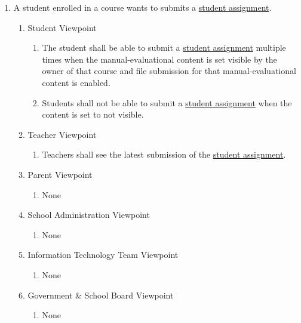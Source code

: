 \documentclass[]{article}
\begin{document}
\begin{enumerate}[{BE}1.]
	\item A student enrolled in a course wants to submits a \underline{student assignment}.
	\begin{enumerate}[{VP2}.1]
		\item Student Viewpoint
			\begin{enumerate}
				\item The student shall be able to submit a \underline{student assignment}
multiple times when the manual-evaluational content is set visible by the
owner of that course and file submission for that manual-evaluational content is
enabled.
\item Students shall not be able to submit a \underline{student assignment} when 
the content is set to not visible.
			\end{enumerate}
		\item Teacher Viewpoint
			\begin{enumerate}
				\item Teachers shall see the latest submission of the \underline{student 
assignment}.
			\end{enumerate}
		\item Parent Viewpoint
			\begin{enumerate}
				\item None
			\end{enumerate}
		\item School Administration Viewpoint
			\begin{enumerate}
				\item None
			\end{enumerate}
		\item Information Technology Team Viewpoint
			\begin{enumerate}
				\item None
			\end{enumerate}
		\item Government \& School Board Viewpoint
			\begin{enumerate}
				\item None
			\end{enumerate}
	\end{enumerate}


\end{enumerate}
\end{document}
